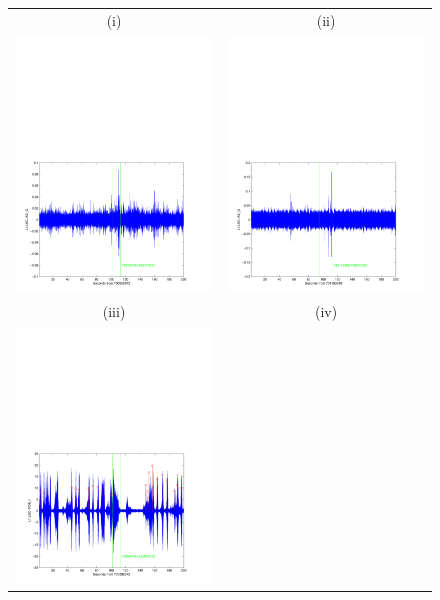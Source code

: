 \begin{figure}[p]
\vspace{5pt}
\begin{center}
\begin{tabular}{cc}
(i) & (ii) \\
\includegraphics[width=0.475\linewidth]{figures/pipeline/trigger_730592784_as_q} &
\includegraphics[width=0.475\linewidth]{figures/pipeline/trigger_734153360_as_q}\\
(iii) & (iv) \\
\includegraphics[width=0.475\linewidth]{figures/pipeline/trigger_730592784_pob_i} &

\end{tabular}
\end{center}
\end{figure}
